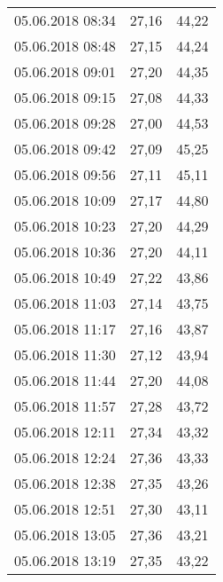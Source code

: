 \documentclass[a4paper,11pt,twoside]{article}
\begin{document}
\begin{longtable}[c]{ccc}
05.06.2018 08:34       & 27,16                & 44,22                          \\
05.06.2018 08:48       & 27,15                & 44,24                          \\
05.06.2018 09:01       & 27,20                & 44,35                          \\
05.06.2018 09:15       & 27,08                & 44,33                          \\
05.06.2018 09:28       & 27,00                & 44,53                          \\
05.06.2018 09:42       & 27,09                & 45,25                          \\
05.06.2018 09:56       & 27,11                & 45,11                          \\
05.06.2018 10:09       & 27,17                & 44,80                          \\
05.06.2018 10:23       & 27,20                & 44,29                          \\
05.06.2018 10:36       & 27,20                & 44,11                          \\
05.06.2018 10:49       & 27,22                & 43,86                          \\
05.06.2018 11:03       & 27,14                & 43,75                          \\
05.06.2018 11:17       & 27,16                & 43,87                          \\
05.06.2018 11:30       & 27,12                & 43,94                          \\
05.06.2018 11:44       & 27,20                & 44,08                          \\
05.06.2018 11:57       & 27,28                & 43,72                          \\
05.06.2018 12:11       & 27,34                & 43,32                          \\
05.06.2018 12:24       & 27,36                & 43,33                          \\
05.06.2018 12:38       & 27,35                & 43,26                          \\
05.06.2018 12:51       & 27,30                & 43,11                          \\
05.06.2018 13:05       & 27,36                & 43,21                          \\
05.06.2018 13:19       & 27,35                & 43,22                          \\

\end{longtable}
\end{document}
